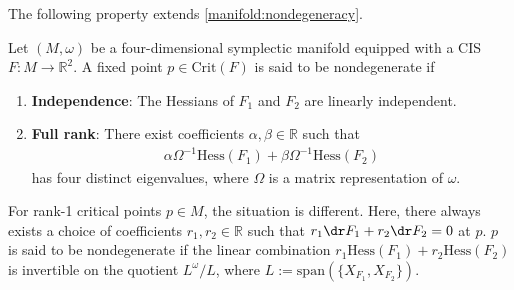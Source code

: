     The following property extends \cref{manifold:nondegeneracy}.
    \begin{property}
        Let $(M,\omega)$ be a four-dimensional symplectic manifold equipped with a CIS $F:M\rightarrow\mathbb{R}^2$. A fixed point $p\in\mathrm{Crit}(F)$ is said to be nondegenerate if
        \begin{enumerate}
            \item\textbf{Independence}: The Hessians of $F_1$ and $F_2$ are linearly independent.
            \item\textbf{Full rank}: There exist coefficients $\alpha,\beta\in\mathbb{R}$ such that
                \begin{gather}
                    \alpha\Omega^{-1}\mathrm{Hess}(F_1)+\beta\Omega^{-1}\mathrm{Hess}(F_2)
                \end{gather}
            has four distinct eigenvalues, where $\Omega$ is a matrix representation of $\omega$.
        \end{enumerate}
        For rank-1 critical points $p\in M$, the situation is different. Here, there always exists a choice of coefficients $r_1,r_2\in\mathbb{R}$ such that $r_1\dr F_1+r_2\dr F_2=0$ at $p$. $p$ is said to be nondegenerate if the linear combination $r_1\mathrm{Hess}(F_1)+r_2\mathrm{Hess}(F_2)$ is invertible on the quotient $L^\omega/L$, where $L:=\mathrm{span}(\{X_{F_1},X_{F_2}\})$.
    \end{property}

